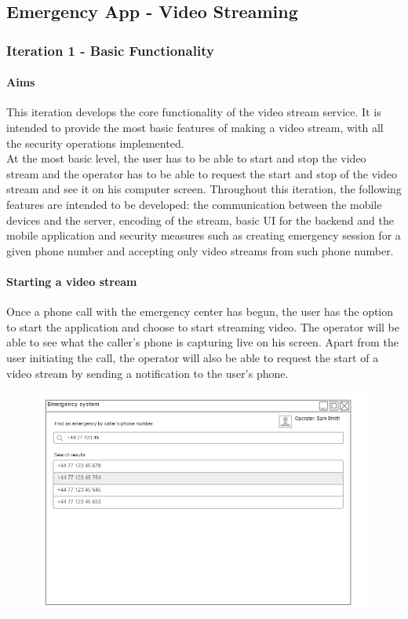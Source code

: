 \documentclass{article}
\begin{document}
	\subsection{Emergency App - Video Streaming}
		\subsubsection{Iteration 1 - Basic Functionality}
			\paragraph{Aims}
			This iteration develops the core functionality of the video stream service. It is intended to provide the most basic features of making a video stream, with all the security operations implemented.\\

			At the most basic level, the user has to be able to start and stop the video stream and the operator has to be able to request the start and stop of the video stream and see it on his computer screen. Throughout this iteration, the following features are intended to be developed: the communication between the mobile devices and the server, encoding of the stream, basic UI for the backend and the mobile application and security measures such as creating emergency session for a given phone number and accepting only video streams from such phone number.
			
			\paragraph{Starting a video stream}
			Once a phone call with the emergency center has begun, the user has the option to start the application and choose to start streaming video. The operator will be able to see what the caller’s phone is capturing live on his screen. Apart from the user initiating the call, the operator will also be able to request the start of a video stream by sending a notification to the user’s phone.
	\begin{figure}[H]
		\centering
		\includegraphics[width=1\textwidth]{"EmergencyAppIteration1/iteration1backendsearch"}
	\end{figure}
	
\end{document}
